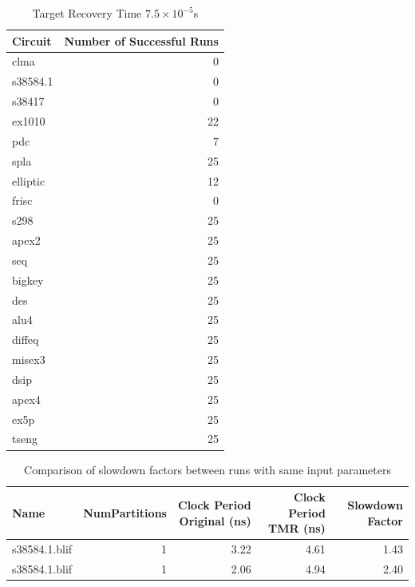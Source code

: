 \documentclass[12pt,final,oneside]{dwThesis} %
\begin{document}
      \begin{table}
	\begin{center}
         \begin{tabular}{lr}
            \toprule
 Circuit &  Number of Successful Runs\\
 \midrule
clma  & 0\\
s38584.1  & 0\\
s38417  & 0\\
ex1010  &  22\\
pdc   &  7\\
spla   &  25\\
elliptic &  12\\
frisc  & 0\\
s298  &   25\\
apex2  & 25\\
seq  &   25\\
bigkey  & 25\\
des  &   25\\
alu4  &   25\\
diffeq  & 25\\
misex3  & 25\\
dsip  &   25\\
apex4  & 25\\
ex5p  &   25\\
tseng  & 25\\
            \bottomrule 

         \end{tabular}
         \caption{Target Recovery Time $7.5\times10^{-5}$s} \label{partitionSuccesses}
   \end{center}\end{table}
   \begin{table}
      \begin{center}

      \begin{tabular}
         {lrrrr} \toprule Name & NumPartitions &
         Clock Period Original (ns) & Clock Period TMR (ns) & Slowdown Factor\\
         \midrule
         s38584.1.blif &	1 & 3.22 & 4.61 & 1.43\\
         s38584.1.blif &	1 & 2.06 &
         4.94 & 2.40\\
         \bottomrule 
      \end{tabular}
      \caption{Comparison of
         slowdown factors between runs with same input
         parameters}\label{tabStochastic} 
   \end{center}\end{table}
\end{document}
